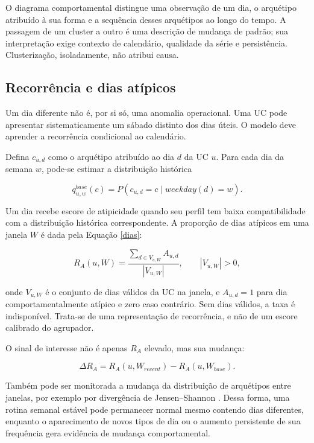 O diagrama comportamental distingue uma observação de um dia, o arquétipo atribuído à sua forma e a sequência desses arquétipos ao longo do tempo. A passagem de um cluster a outro é uma descrição de mudança de padrão; sua interpretação exige contexto de calendário, qualidade da série e persistência. Clusterização, isoladamente, não atribui causa.

\subsection{Recorrência e dias atípicos}\label{recorruxeancia-e-dias-atuxedpicos}

Um dia diferente não é, por si só, uma anomalia operacional. Uma UC pode apresentar sistematicamente um sábado distinto dos dias úteis. O modelo deve aprender a recorrência condicional ao calendário.

Defina \(c_{u,d}\) como o arquétipo atribuído ao dia \(d\) da UC \(u\). Para cada dia da semana \(w\), pode-se estimar a distribuição histórica

\[q^{base}_{u,w}(c)=P(c_{u,d}=c\mid weekday(d)=w).\]

Um dia recebe escore de atipicidade quando seu perfil tem baixa compatibilidade com a distribuição histórica correspondente. A proporção de dias atípicos em uma janela \(W\) é dada pela Equação \eqref{dias}:

\begin{equation}\label{dias}
R_A(u,W)=\frac{\sum_{d\in V_{u,W}}A_{u,d}}{|V_{u,W}|},\qquad |V_{u,W}|>0,
\end{equation}

\noindent onde $V_{u,W}$ é o conjunto de dias válidos da UC na janela, e $A_{u,d}=1$ para dia comportamentalmente atípico e zero caso contrário. Sem dias válidos, a taxa é indisponível. Trata-se de uma representação de recorrência, e não de um escore calibrado do agrupador.

O sinal de interesse não é apenas \(R_A\) elevado, mas sua mudança:

\[\Delta R_A=R_A(u,W_{recent})-R_A(u,W_{base}).\]

Também pode ser monitorada a mudança da distribuição de arquétipos entre janelas, por exemplo por divergência de Jensen--Shannon \autocite{lin1991}. Dessa forma, uma rotina semanal estável pode permanecer normal mesmo contendo dias diferentes, enquanto o aparecimento de novos tipos de dia ou o aumento persistente de sua frequência gera evidência de mudança comportamental.

